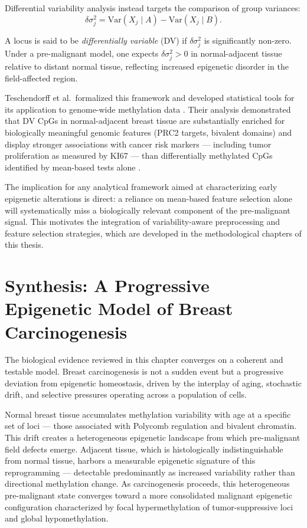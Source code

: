Differential variability analysis instead targets the comparison of group
variances:
\[
\delta\sigma^2_j = \text{Var}(X_j \mid A) - \text{Var}(X_j \mid B).
\]

A locus is said to be \textit{differentially variable} (DV) if $\delta\sigma^2_j$
is significantly non-zero. Under a pre-malignant model, one expects $\delta\sigma^2_j > 0$
in normal-adjacent tissue relative to distant normal tissue, reflecting increased
epigenetic disorder in the field-affected region.

Teschendorff et al.\ formalized this framework and developed statistical tools
for its application to genome-wide methylation data \cite{Teschendorff2014}.
Their analysis demonstrated that DV CpGs in normal-adjacent breast tissue are
substantially enriched for biologically meaningful genomic features (PRC2 targets,
bivalent domains) and display stronger associations with cancer risk markers —
including tumor proliferation as measured by KI67 — than differentially methylated
CpGs identified by mean-based tests alone \cite{Teschendorff2016}.

The implication for any analytical framework aimed at characterizing early
epigenetic alterations is direct: a reliance on mean-based feature selection alone
will systematically miss a biologically relevant component of the pre-malignant
signal. This motivates the integration of variability-aware preprocessing and
feature selection strategies, which are developed in the methodological chapters
of this thesis.

\section{Synthesis: A Progressive Epigenetic Model of Breast Carcinogenesis}

The biological evidence reviewed in this chapter converges on a coherent and
testable model. Breast carcinogenesis is not a sudden event but a progressive
deviation from epigenetic homeostasis, driven by the interplay of aging, stochastic
drift, and selective pressures operating across a population of cells.

Normal breast tissue accumulates methylation variability with age at a specific
set of loci — those associated with Polycomb regulation and bivalent chromatin.
This drift creates a heterogeneous epigenetic landscape from which pre-malignant
field defects emerge. Adjacent tissue, which is histologically indistinguishable
from normal tissue, harbors a measurable epigenetic signature of this
reprogramming — detectable predominantly as increased variability rather than
directional methylation change. As carcinogenesis proceeds, this heterogeneous
pre-malignant state converges toward a more consolidated malignant epigenetic
configuration characterized by focal hypermethylation of tumor-suppressive loci
and global hypomethylation.

